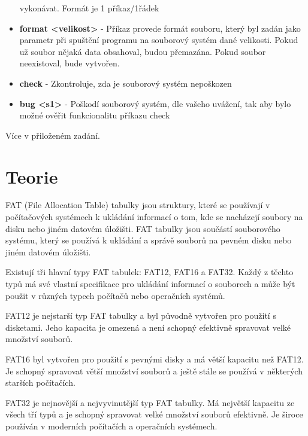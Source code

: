 \documentclass[12pt, a4paper]{article}
\begin{document}
\begin{itemize}
        vykonávat. Formát je 1 příkaz/1řádek
        \item \textbf{format \textless velikost\textgreater } - Příkaz provede formát souboru, který byl zadán jako parametr při spuštění programu na
        souborový systém dané velikosti. Pokud už soubor nějaká data obsahoval, budou přemazána.
        Pokud soubor neexistoval, bude vytvořen.
        \item \textbf{check} - Zkontroluje, zda je souborový systém nepoškozen
        \item \textbf{bug \textless s1\textgreater } - Poškodí souborový systém, dle vašeho uvážení, tak aby bylo možné
        ověřit funkcionalitu příkazu check
    \end{itemize}

    Více v přiloženém zadání.
    

\section{Teorie}

    FAT (File Allocation Table) tabulky jsou struktury, které se používají v počítačových systémech k ukládání informací o tom, kde se nacházejí soubory na disku nebo jiném datovém úložišti. FAT tabulky jsou součástí souborového systému, který se používá k ukládání a správě souborů na pevném disku nebo jiném datovém úložišti.

    \vspace{0.3cm}
    \noindent Existují tři hlavní typy FAT tabulek: FAT12, FAT16 a FAT32. Každý z těchto typů má své vlastní specifikace pro ukládání informací o souborech a může být použit v různých typech počítačů nebo operačních systémů.

    \vspace{0.3cm}
    \noindent FAT12 je nejstarší typ FAT tabulky a byl původně vytvořen pro použití s disketami. Jeho kapacita je omezená a není schopný efektivně spravovat velké množství souborů.

    \vspace{0.3cm}
    \noindent FAT16 byl vytvořen pro použití s pevnými disky a má větší kapacitu než FAT12. Je schopný spravovat větší množství souborů a ještě stále se používá v některých starších počítačích.

    \vspace{0.3cm}
    \noindent FAT32 je nejnovější a nejvyvinutější typ FAT tabulky. Má největší kapacitu ze všech tří typů a je schopný spravovat velké množství souborů efektivně. Je široce používán v moderních počítačích a operačních systémech.
\end{document}
